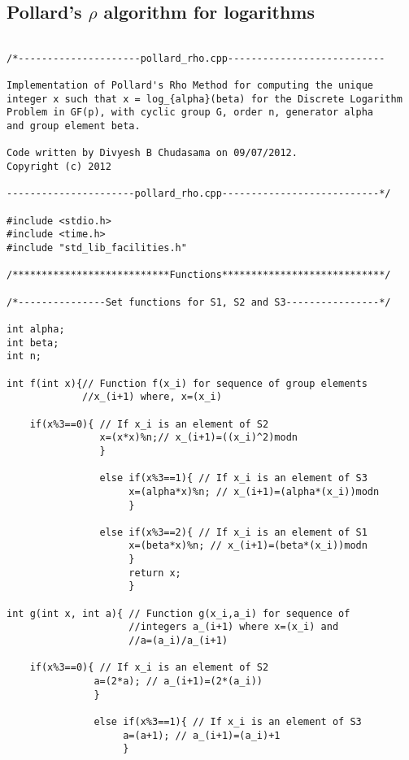 \documentclass[iwp,first]{luthesis}
\begin{document}
\subsection{Pollard's $\rho$ algorithm for logarithms}

\begin{verbatim}

/*---------------------pollard_rho.cpp---------------------------

Implementation of Pollard's Rho Method for computing the unique 
integer x such that x = log_{alpha}(beta) for the Discrete Logarithm 
Problem in GF(p), with cyclic group G, order n, generator alpha 
and group element beta.

Code written by Divyesh B Chudasama on 09/07/2012.
Copyright (c) 2012

----------------------pollard_rho.cpp---------------------------*/

#include <stdio.h>
#include <time.h>
#include "std_lib_facilities.h"

/***************************Functions****************************/

/*---------------Set functions for S1, S2 and S3----------------*/

int alpha;
int beta;
int n;

int f(int x){// Function f(x_i) for sequence of group elements 
             //x_(i+1) where, x=(x_i)
    
    if(x%3==0){ // If x_i is an element of S2
                x=(x*x)%n;// x_(i+1)=((x_i)^2)modn
                }
                
                else if(x%3==1){ // If x_i is an element of S3
                     x=(alpha*x)%n; // x_(i+1)=(alpha*(x_i))modn
                     }
                     
                else if(x%3==2){ // If x_i is an element of S1
                     x=(beta*x)%n; // x_(i+1)=(beta*(x_i))modn
                     }
                     return x;
                     }

int g(int x, int a){ // Function g(x_i,a_i) for sequence of 
                     //integers a_(i+1) where x=(x_i) and 
                     //a=(a_i)/a_(i+1)
    
    if(x%3==0){ // If x_i is an element of S2
               a=(2*a); // a_(i+1)=(2*(a_i))
               }
               
               else if(x%3==1){ // If x_i is an element of S3
                    a=(a+1); // a_(i+1)=(a_i)+1
                    }
                    

\end{verbatim}
\end{document}
